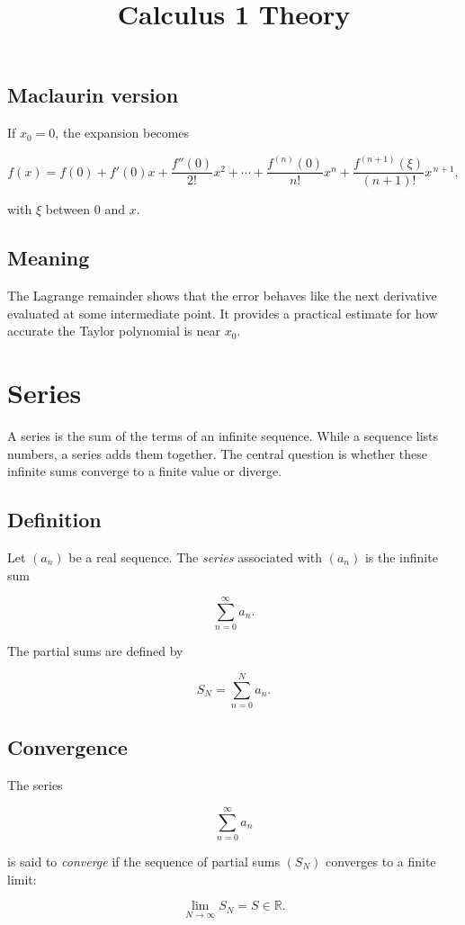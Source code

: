 \documentclass[11pt,a4paper]{article} \usepackage[T1]{fontenc}
\theoremstyle{plain} \newtheorem{theorem}{Theorem} \title{Calculus 1 Theory}
\begin{document}
\subsection*{Maclaurin version}

If $x_0 = 0$, the expansion becomes

\[
f(x) = f(0)
+ f'(0)x
+ \frac{f''(0)}{2!}x^2
+ \cdots
+ \frac{f^{(n)}(0)}{n!}x^n
+ \frac{f^{(n+1)}(\xi)}{(n+1)!}x^{\,n+1},
\]

with $\xi$ between $0$ and $x$.

\subsection*{Meaning}

The Lagrange remainder shows that the error behaves like the next derivative
evaluated at some intermediate point. It provides a practical estimate for how
accurate the Taylor polynomial is near $x_0$.

\section {Series}

A series is the sum of the terms of an infinite sequence. While a sequence
lists numbers, a series adds them together. The central question is whether
these infinite sums converge to a finite value or diverge.

\subsection*{Definition}

Let $(a_n)$ be a real sequence. The \emph{series} associated with $(a_n)$ is
the infinite sum

\[
\sum_{n=0}^{\infty} a_n.
\]

The partial sums are defined by

\[
S_N = \sum_{n=0}^{N} a_n.
\]

\subsection*{Convergence}

The series

\[
\sum_{n=0}^{\infty} a_n
\]

is said to \emph{converge} if the sequence of partial sums $(S_N)$ converges to
a finite limit:

\[
\lim_{N\to\infty} S_N = S \in \mathbb{R}.
\]
\end{document}

